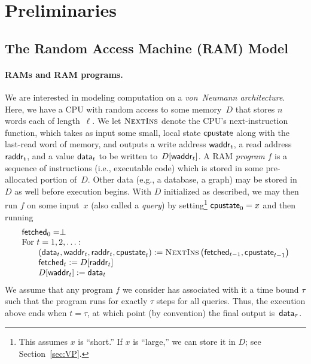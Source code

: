 \section{Preliminaries}
\label{sec:prelim}




\subsection{The Random Access Machine (RAM) Model}
\label{sec:def-RAMs}

\paragraph{RAMs and RAM programs.}
We are interested in modeling computation on a \emph{von~Neumann architecture}.
Here, we have a CPU with random access to some memory~$D$ that stores $n$ words
each of length~$\ell$.
We let $\textsc{NextIns}$ denote the CPU's next-instruction function, which takes as input
some small, local state $\mathsf{cpustate}$ along with the last-read word of memory, and outputs
a write address
$\mathsf{waddr}_t$, a read address $\mathsf{raddr}_t$,
and a value $\mathsf{data}_t$ to be written to~$D[\mathsf{waddr}_t]$.
A RAM \emph{program} $f$ is a sequence of instructions (i.e., executable code)
which is stored in some pre-allocated portion of~$D$.
Other data (e.g., a database, a graph)
may be stored in~$D$ as well before execution begins.
With $D$ initialized as described,
we may then run $f$ on some input~$x$ (also called a \emph{query})
by setting\footnote{This assumes $x$ is ``short.''
If $x$ is ``large,'' we can store it in $D$;
see Section~\ref{sec:VP}.} $\mathsf{cpustate}_0=x$ and then running
\[
\begin{array}{l}
{\sf fetched}_0 = \perp\\
\text{For } t = 1, 2, \ldots:\\
\qquad \left(\mathsf{data}_t, \mathsf{waddr}_{t}, \mathsf{raddr}_{t}, \mathsf{cpustate}_{t}\right) :=
\textsc{NextIns}\left({\sf fetched}_{t-1}, \mathsf{cpustate}_{t-1}\right)\\
\qquad {\sf fetched}_t := D[\mathsf{raddr}_{t}]\\
\qquad D[\mathsf{waddr}_t] := \mathsf{data}_t
\end{array}
\]
We assume that any program $f$ we consider has associated with it a time bound $\tau$
such that the program runs for exactly $\tau$ steps for all queries.
Thus, the execution above ends when $t=\tau$, at which point (by convention)
the final output is~$\mathsf{data}_\tau$.


